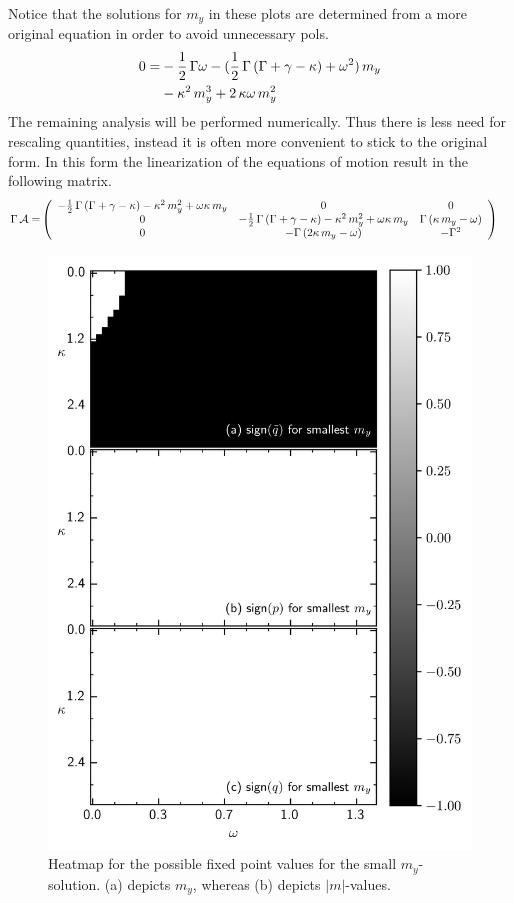 \documentclass{article}
\begin{document}
Notice that the solutions for $m_y$ in these plots are determined from a more original equation in order to avoid unnecessary pols.
\begin{align*}
    0=&-\frac{1}{2}\,\Gamma\omega-(\frac{1}{2}\,\Gamma\,(\Gamma+\gamma-\kappa)+\omega^2)\,m_y\\&-\kappa^2\,m_y^3+2\,\kappa\omega\,m_y^2
\end{align*}
The remaining analysis will be performed numerically. Thus there is less need for rescaling quantities, instead it is often more convenient to stick to the original form. In this form the linearization of the equations of motion result in the following matrix.
\begin{align*}
    \Gamma\,\mathcal{A}=&\left( \begin{array}{c c c}
        -\frac{1}{2}\,\Gamma\,(\Gamma+\gamma-\kappa)-\kappa^2\,m_y^2
        +\omega\kappa\,m_y&0&0\\
        0&-\frac{1}{2}\,\Gamma\,(\Gamma+\gamma-\kappa)-\kappa^2\,m_y^2
        +\omega\kappa\,m_y&\Gamma\,(\kappa\,m_y-\omega)\\
        0&-\Gamma\,(2\kappa\,m_y-\omega)&-\Gamma^2
    \end{array}  \right)
\end{align*}
\begin{figure}
    \includegraphics{pictures/lam2_anal_s.png}
    \vspace*{-2cm}\caption{Heatmap for the possible fixed point values for the small $m_y$-solution. (a) depicts $m_y$, whereas (b) depicts $|m|$-values.}
    \label{fig:sign_lam23_s}
\end{figure}
\end{document}
